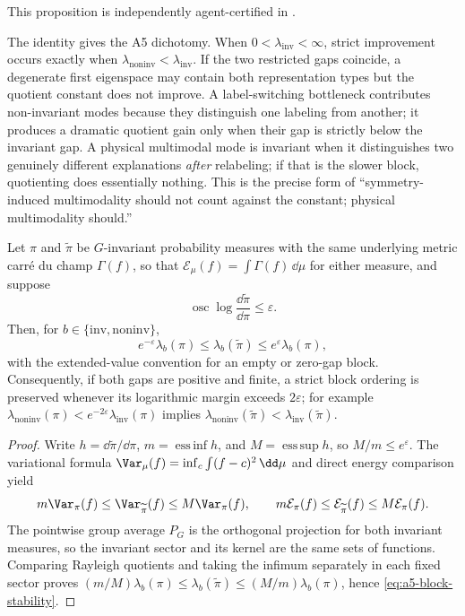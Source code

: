 \documentclass[../../main.tex]{subfiles}
\begin{document}
\noindent This proposition is independently agent-certified in
.

\noindent The identity gives the A5 dichotomy. When $0<\lambda_{\mathrm{inv}}<\infty$,
strict improvement occurs exactly when
$\lambda_{\mathrm{noninv}}<\lambda_{\mathrm{inv}}$. If the two restricted gaps coincide, a
degenerate first eigenspace may contain both representation types but the quotient constant does
not improve. A label-switching bottleneck contributes non-invariant modes because they distinguish
one labeling from another; it produces a dramatic quotient gain only when their gap is strictly
below the invariant gap. A physical multimodal mode is invariant when it distinguishes two
genuinely different explanations \emph{after} relabeling; if that is the slower block, quotienting
does essentially nothing. This is the
precise form of ``symmetry-induced multimodality should not count against the constant;
physical multimodality should.''

\begin{proposition}
\label{prop:a5-block-stability}
Let $\pi$ and $\widetilde\pi$ be $G$-invariant probability measures with the same underlying
metric carr\'e du champ $\Gamma(f)$, so that
$\mathcal E_\mu(f)=\int\Gamma(f)\,\dd\mu$ for either measure, and suppose
\[
 \operatorname*{osc}\log\frac{\dd\widetilde\pi}{\dd\pi}\le\varepsilon.
\]
Then, for $b\in\{\mathrm{inv},\mathrm{noninv}\}$,
\begin{equation}\label{eq:a5-block-stability}
 e^{-\varepsilon}\lambda_b(\pi)
 \le\lambda_b(\widetilde\pi)
 \le e^{\varepsilon}\lambda_b(\pi),
\end{equation}
with the extended-value convention for an empty or zero-gap block. Consequently, if both gaps
are positive and finite, a strict block ordering is preserved whenever its logarithmic margin
exceeds $2\varepsilon$; for example
$\lambda_{\mathrm{noninv}}(\pi)<e^{-2\varepsilon}\lambda_{\mathrm{inv}}(\pi)$ implies
$\lambda_{\mathrm{noninv}}(\widetilde\pi)<\lambda_{\mathrm{inv}}(\widetilde\pi)$.
\end{proposition}

\begin{proof}
Write $h=\dd\widetilde\pi/\dd\pi$, $m=\operatorname*{ess\,inf}h$, and
$M=\operatorname*{ess\,sup}h$, so $M/m\le e^\varepsilon$. The variational formula
$\Var_\mu(f)=\inf_c\int(f-c)^2\,\dd\mu$ and direct energy comparison yield
\[
 m\Var_\pi(f)\le\Var_{\widetilde\pi}(f)
 \le M\Var_\pi(f),\qquad
 m\mathcal E_\pi(f)\le\mathcal E_{\widetilde\pi}(f)
 \le M\mathcal E_\pi(f).
\]
The pointwise group average $P_G$ is the orthogonal projection for both invariant measures, so
the invariant sector and its kernel are the same sets of functions. Comparing Rayleigh quotients
and taking the infimum separately in each fixed sector proves
$(m/M)\lambda_b(\pi)\le\lambda_b(\widetilde\pi)\le(M/m)\lambda_b(\pi)$, hence
\eqref{eq:a5-block-stability}.
\end{proof}
\end{document}
